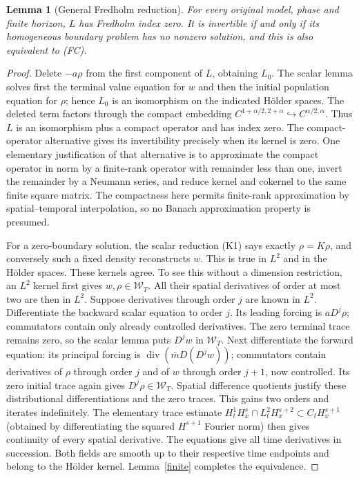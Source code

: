 \documentclass[11pt,a4paper]{article}
\newtheorem{lemma}[theorem]{Lemma}
\begin{document}
\begin{lemma}[General Fredholm reduction]\label{fredholm}
For every original model, phase and finite horizon, $L$ has Fredholm
index zero. It is invertible if and only if its homogeneous boundary
problem has no nonzero solution, and this is also equivalent to (FC).
\end{lemma}
\begin{proof}
Delete $-a\rho$ from the first component of $L$, obtaining $L_0$.
The scalar lemma solves first the terminal value equation for $w$ and
then the initial population equation for $\rho$; hence $L_0$ is an
isomorphism on the indicated H\"older spaces. The deleted term factors
through the compact embedding
$C^{1+\alpha/2,2+\alpha}\hookrightarrow C^{\alpha/2,\alpha}$.
Thus $L$ is an isomorphism plus a compact operator and has index zero.
The compact-operator alternative gives its invertibility precisely
when its kernel is zero. One elementary justification of that
alternative is to approximate the compact operator in norm by a
finite-rank operator with remainder less than one, invert the remainder
by a Neumann series, and reduce kernel and cokernel to the same finite
square matrix. The compactness here permits finite-rank approximation
by spatial--temporal interpolation, so no Banach approximation
property is presumed.

For a zero-boundary solution, the scalar reduction (K1) says exactly
$\rho=K\rho$, and conversely such a fixed density reconstructs $w$.
This is true in $L^2$ and in the H\"older spaces. These kernels agree.
To see this without a dimension restriction, an $L^2$ kernel first
gives $w,\rho\in\mathcal W_T$. All their spatial derivatives of order
at most two are then in $L^2$. Suppose derivatives through order $j$
are known in $L^2$. Differentiate the backward scalar equation to
order $j$. Its leading forcing is $aD^j\rho$; commutators contain
only already controlled derivatives. The zero terminal trace remains
zero, so the scalar lemma puts $D^jw$ in $\mathcal W_T$.
Next differentiate the forward equation: its principal forcing is
$\operatorname{div}(\bar m D(D^jw))$; commutators contain derivatives
of $\rho$ through order $j$ and of $w$ through order $j+1$, now
controlled. Its zero initial trace again gives
$D^j\rho\in\mathcal W_T$. Spatial difference quotients justify
these distributional differentiations and the zero traces.
This gains two orders and iterates indefinitely. The elementary
trace estimate
$H^1_tH^s_x\cap L^2_tH^{s+2}_x\subset C_tH^{s+1}_x$
(obtained by differentiating the squared $H^{s+1}$ Fourier norm)
then gives continuity of every spatial derivative. The equations
give all time derivatives in succession. Both fields are smooth
up to their respective time endpoints and belong to the H\"older
kernel. Lemma~\ref{finite} completes the equivalence.
\end{proof}
\end{document}
